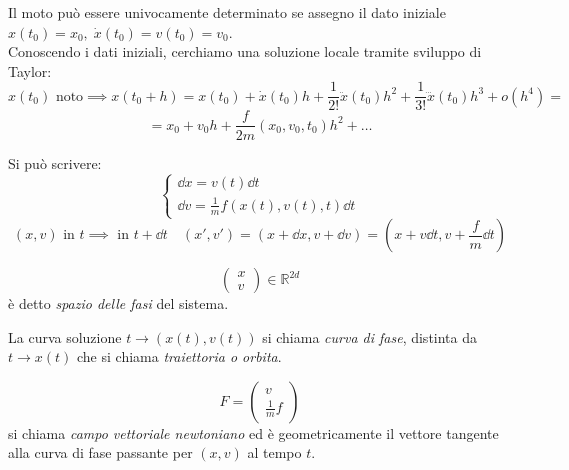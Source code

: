 Il moto può essere univocamente determinato se assegno il dato iniziale $x(t_0)=x_0,\;\dot{x}(t_0)= v(t_0)=v_0$.\\
Conoscendo i dati iniziali, cerchiamo una soluzione locale tramite sviluppo di Taylor: 
\begin{equation*}
    x(t_0) \text{ noto}\implies x(t_0+h)= x(t_0)+\dot{x}(t_0) h +\frac{1}{2!}\ddot{x}(t_0) h^2 +\frac{1}{3!}\dddot{x}(t_0)h^3  + o(h^4)= 
\end{equation*}
\begin{equation*}
   = x_0 +v_0 h + \frac{f}{2m}(x_0,v_0,t_0) h^2 + \dots
\end{equation*}

Si può scrivere:
\begin{equation}
    \begin{cases}
        \dd{x}= v(t)\dd{t}\\
        \dd{v}= \frac{1}{m}f(x(t),v(t),t)\dd{t} 
    \end{cases}
\end{equation}
\begin{equation*}
    (x,v) \text{ in } t \implies  \text{ in } t +\dd{t} \quad (x',v')= (x+\dd{x},v+\dd{v})= (x+v\dd{t},v+ \frac{f}{m}\dd{t})
\end{equation*}

\begin{definition}
    \begin{equation*}
        \begin{pmatrix}
            x\\v  
        \end{pmatrix}\in \mathbb{R}^{2d} 
    \end{equation*}
    è detto \textit{spazio delle fasi} del sistema. 
\end{definition}

\begin{definition}
    La curva soluzione $t\rightarrow(x(t),v(t))$ si chiama \textit{curva di fase}, distinta da $t\rightarrow x(t)$ che si chiama 
    \textit{traiettoria o orbita}.
\end{definition}

\begin{definition}
    \begin{equation*}
        F=\begin{pmatrix}
            v\\\frac{1}{m}f 
        \end{pmatrix}
    \end{equation*}
    si chiama \textit{campo vettoriale newtoniano} ed è geometricamente il vettore tangente alla curva di fase passante per $(x,v)$ al tempo $t$.
\end{definition}

